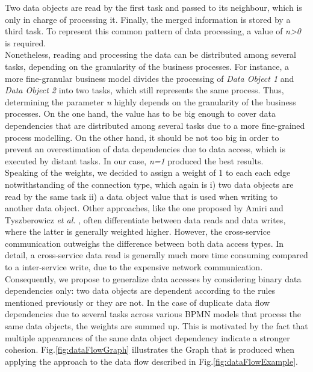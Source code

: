 \noindent
Two data objects are read by the first task and passed to its neighbour, which is only in charge of processing it. Finally, the merged information is stored by a third task. To represent this common pattern of data processing, a value of \textit{n>0} is required. \\
Nonetheless, reading and processing the data can be distributed among several tasks, depending on the granularity of the business processes. For instance, a more fine-granular business model divides the processing of \textit{Data Object 1} and \textit{Data Object 2} into two tasks, which still represents the same process.
Thus, determining the parameter \textit{n} highly depends on the granularity of the business processes. On the one hand, the value has to be big enough to cover data dependencies that are distributed among several tasks due to a more fine-grained process modelling. On the other hand, it should be not too big in order to prevent an overestimation of data dependencies due to data access, which is executed by distant tasks. In our case, \textit{n=1} produced the best results. \\
Speaking of the weights, we decided to assign a weight of 1 to each each edge notwithstanding of the connection type, which again is i) two data objects are read by the same task ii) a data object value that is used when writing to another data object. Other approaches, like the one proposed by Amiri \cite{ObjectAwareAmiri} and Tyszberowicz \textit{et al.} \cite{FunctionalDecompositionHeinrich}, often differentiate between data reads and data writes, where the latter is generally weighted higher. However, the cross-service communication outweighs the difference between both data access types. In detail, a cross-service data read is generally much more time consuming compared to a inter-service write, due to the expensive network communication. Consequently, we propose to generalize data accesses by considering binary data dependencies only: two data objects are dependent according to the rules mentioned previously or they are not. 
In the case of duplicate data flow dependencies due to several tasks across various BPMN models that process the same data objects, the weights are summed up. This is motivated by the fact that multiple appearances of the same data object dependency indicate a stronger cohesion.
Fig.\ref{fig:dataFlowGraph} illustrates the Graph that is produced when applying the approach to the data flow described in Fig.\ref{fig:dataFlowExample}.







